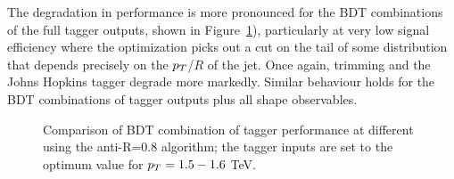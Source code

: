 The degradation in performance is more pronounced for the BDT combinations of the full tagger outputs, shown in Figure~\ref{fig:ptcomparison_top_optOnce}), particularly at very low signal efficiency where the optimization picks out a cut on the tail of some distribution that depends precisely on the $p_T$/$R$ of the jet. Once again, trimming and the Johns Hopkins tagger degrade more markedly.  Similar behaviour holds for the BDT combinations of tagger outputs plus all shape observables.\\

\begin{figure}
\centering
{}
\caption{Comparison of BDT combination of tagger performance at different \pt using the anti-\kT R=0.8 algorithm; the tagger inputs are set to the optimum value for $p_T=1.5-1.6$ TeV.}
\label{fig:ptcomparison_top_optOnce}
\end{figure}


